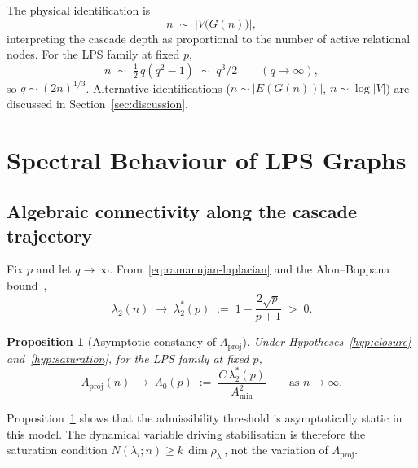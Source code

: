 \documentclass[12pt, a4paper]{article}
\theoremstyle{plain}
\newtheorem{proposition}{Proposition}[section]
\theoremstyle{definition}
\theoremstyle{remark}
\begin{document}
      The physical identification is
      \begin{equation}
        \label{eq:index-id}
        n \;\sim\; \bigl|V\bigl(G(n)\bigr)\bigr|,
      \end{equation}
      interpreting the cascade depth as proportional to the number of active
      relational nodes.
      For the LPS family at fixed $p$,
      \begin{equation}
        \label{eq:index-lps}
        n \;\sim\; \tfrac{1}{2}\,q(q^2 - 1) \;\sim\; q^3/2
        \qquad (q \to \infty),
      \end{equation}
      so $q \sim (2n)^{1/3}$.
      Alternative identifications ($n \sim |E(G(n))|$, $n \sim \log|V|$) are
      discussed in Section~\ref{sec:discussion}.
  \section{Spectral Behaviour of LPS Graphs}
    \label{sec:spectral}

    \subsection{Algebraic connectivity along the cascade trajectory}
      \label{sec:spectral:lambda2}

      Fix $p$ and let $q \to \infty$.
      From~\eqref{eq:ramanujan-laplacian} and the Alon--Boppana
      bound~\cite{Alon1986},
      \begin{equation}
        \label{eq:lambda2-limit}
        \lambda_2(n) \;\longrightarrow\; \lambda_2^*(p)
        \;:=\; 1 - \frac{2\sqrt{p}}{p+1} \;>\; 0.
      \end{equation}

      \begin{proposition}[Asymptotic constancy of $\Lambda_{\mathrm{proj}}$]
        \label{prop:Lambda-constant}
        Under Hypotheses~\ref{hyp:closure} and~\ref{hyp:saturation}, for the LPS
        family at fixed $p$,
        \begin{equation}
          \label{eq:Lambda-constant}
          \Lambda_{\mathrm{proj}}(n) \;\longrightarrow\; \Lambda_0(p)
          \;:=\; \frac{C\,\lambda_2^*(p)}{A_{\min}^2}
          \qquad \text{as } n \to \infty.
        \end{equation}
      \end{proposition}

      \noindent
      Proposition~\ref{prop:Lambda-constant} shows that the admissibility threshold
      is asymptotically static in this model.
      The dynamical variable driving stabilisation is therefore the saturation
      condition $N(\lambda_i; n) \geq k\,\dim\rho_{\lambda_i}$, not the variation
      of $\Lambda_{\mathrm{proj}}$.
\end{document}
